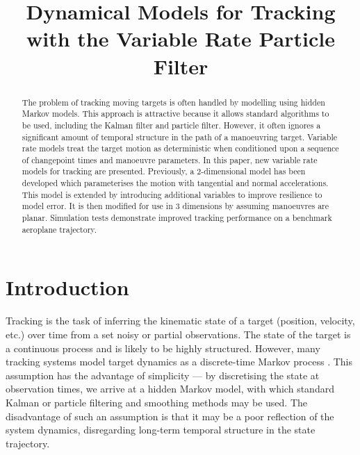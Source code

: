 \documentclass[conference]{IEEEtran}
\begin{document}
\title{Dynamical Models for Tracking with the Variable Rate Particle Filter}

\author{
}

\maketitle



\begin{abstract}

The problem of tracking moving targets is often handled by modelling using hidden Markov models. This approach is attractive because it allows standard algorithms to be used, including the Kalman filter and particle filter. However, it often ignores a significant amount of temporal structure in the path of a manoeuvring target. Variable rate models treat the target motion as deterministic when conditioned upon a sequence of changepoint times and manoeuvre parameters. In this paper, new variable rate models for tracking are presented. Previously, a 2-dimensional model has been developed which parameterises the motion with tangential and normal accelerations. This model is extended by introducing additional variables to improve resilience to model error. It is then modified for use in 3 dimensions by assuming manoeuvres are planar. Simulation tests demonstrate improved tracking performance on a benchmark aeroplane trajectory.

\end{abstract}



\section{Introduction}

Tracking is the task of inferring the kinematic state of a target (position, velocity, etc.) over time from a set noisy or partial observations. The state of the target is a continuous process and is likely to be highly structured. However, many tracking systems model target dynamics as a discrete-time Markov process \cite{Li2003}. This assumption has the advantage of simplicity --- by discretising the state at observation times, we arrive at a hidden Markov model, with which standard Kalman \cite{Anderson1979} or particle \cite{Cappe2007,Doucet2009} filtering and smoothing methods may be used. The disadvantage of such an assumption is that it may be a poor reflection of the system dynamics, disregarding long-term temporal structure in the state trajectory.
\end{document}
